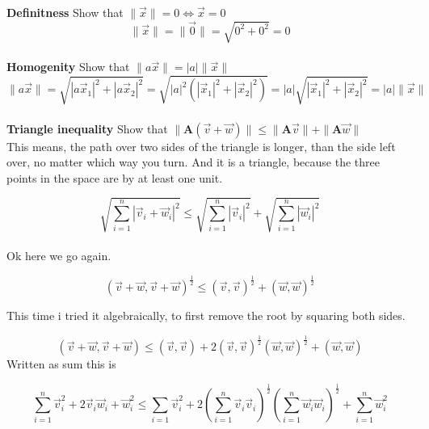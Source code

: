 \documentclass[a4paper]{article}
\begin{document}
\textbf{Definitness} Show that $\|\vec{x}\| = 0 \iff \vec{x} = 0$\\

\begin{displaymath}
    \|\vec{x}\| = \|\vec{0}\| = \sqrt{0^{2} + 0^{2}} = 0
\end{displaymath}\\

\textbf{Homogenity} Show that $\|a\vec{x}\| = |a|\|\vec{x}\|$\\

\begin{displaymath}
    \|a\vec{x}\| = \sqrt{|a\vec{x}_1|^{2} + |a\vec{x}_2|^{2}} = \sqrt{|a|^{2}(|\vec{x}_1|^{2} + |\vec{x}_2|^{2})} = |a|\sqrt{|\vec{x}_1|^{2} + |\vec{x}_2|^{2}} = |a|\|\vec{x}\|
\end{displaymath}\\

\textbf{Triangle inequality} Show that $ \|\boldsymbol{A}(\vec{v} + \vec{w})\| \leq \|\boldsymbol{A}\vec{v}\| + \|\boldsymbol{A}\vec{w}\|$\\

This means, the path over two sides of the triangle is longer, than the side left over, no matter which way you turn. And it is a triangle, because the three points in the space are by at least one unit.

\begin{displaymath}
    \sqrt{\sum_{i=1}^{n}|\vec{v}_{i} + \vec{w}_{i}|^{2}} \leq \sqrt{\sum_{i=1}^{n}|\vec{v}_{i}|^{2}} + \sqrt{\sum_{i=1}^{n}|\vec{w}_{i}|^{2}} 
\end{displaymath}\\

Ok here we go again.

\begin{displaymath}
(\vec{v}+\vec{w}, \vec{v}+\vec{w})^{\frac{1}{2}} \leq (\vec{v},\vec{v})^{\frac{1}{2}}+(\vec{w},\vec{w})^{\frac{1}{2}}
\end{displaymath}

 This time i tried it algebraically, to first remove the root by squaring both sides. 

\begin{displaymath}
(\vec{v}+\vec{w}, \vec{v}+\vec{w}) \leq (\vec{v},\vec{v}) + 2(\vec{v},\vec{v})^{\frac{1}{2}}(\vec{w},\vec{w})^{\frac{1}{2}} + (\vec{w},\vec{w})
\end{displaymath}
Written as sum this is

\begin{displaymath}
\sum_{i=1}^{n}\vec{v}_{i}^{2}+2\vec{v}_{i}\vec{w}_{i}+\vec{w}_{i}^{2} \leq \sum_{i=1}\vec{v}_{i}^{2}+2(\sum_{i=1}^{n}\vec{v}_{i}\vec{v}_{i})^{\frac{1}{2}}(\sum_{i=1}^{n}\vec{w}_{i}\vec{w}_{i})^{\frac{1}{2}}+\sum_{i=1}^{n}\vec{w}_{i}^{2}
\end{displaymath}
\end{document}
